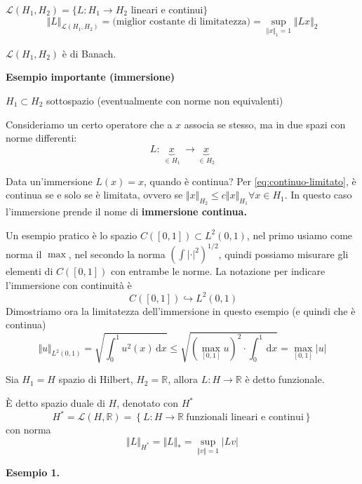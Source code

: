 \documentclass[10pt,a4paper,twoside,openright]{book}
\newcommand{\de}{\,\mathrm d}
\newcommand{\dx}{\de x}
\begin{document}
\begin{definition}
	$\mathcal{L}(H_{1},H_{2}) =\{L:H_{1}\rightarrow H_{2}$ lineari e continui$\}$
	\begin{equation*}
		\Vert L\Vert _{\mathcal{L}(H_{1},H_{2})} =\text{(miglior costante di limitatezza)} =\sup _{\Vert x\Vert _{1} =1}\Vert Lx\Vert _{2}
	\end{equation*}
\end{definition}
\begin{theorem}
	$\displaystyle \mathcal{L}(H_{1},H_{2})$ è di Banach.
\end{theorem}
\textbf{Esempio importante (immersione)}

$\displaystyle H_{1} \subset H_{2}$ sottospazio (eventualmente con norme non equivalenti)

Consideriamo un certo operatore che a $x$ associa se stesso, ma in due spazi con norme differenti:
\begin{equation*}
	L:\ \underbrace{x}_{\in H_{1}} \ \rightarrow \underbrace{x}_{\in H_{2}}
\end{equation*}

Data un'immersione $\displaystyle L(x) =x$, quando è continua? Per \eqref{eq:continuo-limitato}, è continua se e solo se è limitata, ovvero se $\displaystyle \Vert x\Vert _{H_{2}} \leqslant c\Vert x\Vert _{H_{1}} \forall x\in H_{1}$. In questo caso l'immersione prende il nome di \textbf{immersione continua.}

Un esempio pratico è lo spazio $\displaystyle C([ 0,1]) \subset L^{2}(0,1)$, nel primo usiamo come norma il $\max$, nel secondo la norma $\left(\int | \cdot | ^{2}\right)^{1/2}$, quindi possiamo misurare gli elementi di $\displaystyle C([ 0,1])$ con entrambe le norme. La notazione per indicare l'immersione con continuità è
\begin{equation*}
	\ C([ 0,1]) \hookrightarrow L^{2}(0,1)
\end{equation*}
Dimostriamo ora la limitatezza dell'immersione in questo esempio (e quindi che è continua)
\begin{equation*}
	\Vert u\Vert _{L^{2}(0,1)} =\sqrt{\int ^{1}_{0} u^{2}(x) \dx} \leqslant \sqrt{\left(\max_{[ 0,1]} u\right)^{2} \cdot \int ^{1}_{0} \dx} =\max_{[ 0,1]}| u| 
\end{equation*}
\begin{definition}
	[Funzionale] Sia $\displaystyle H_{1} =H$ spazio di Hilbert, $\displaystyle H_{2} =\mathbb{R}$, allora $\displaystyle L:H\rightarrow \mathbb{R}$ è detto funzionale.
\end{definition}
\begin{definition}
	 È detto spazio duale di $H$, denotato con $\displaystyle H^{*}$
	\begin{equation*}
		H^{*} =\mathcal{L}(H,\mathbb{R}) =\left\{L:H\rightarrow \mathbb{R} \ \text{funzionali lineari e continui}\right\}
	\end{equation*}
	con norma
	\begin{equation*}
		\Vert L\Vert _{H^{*}} =\Vert L\Vert _{*} =\sup _{\Vert v\Vert =1}| Lv| 
	\end{equation*}
\end{definition}
\textbf{Esempio 1.}
\end{document}
